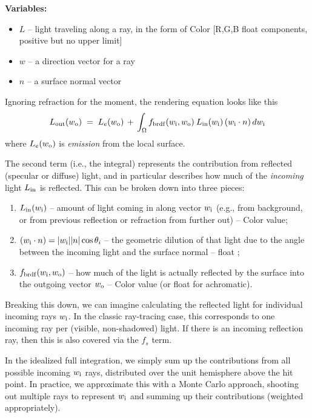 \documentclass[11pt]{article}
\newcommand{\win}{\ensuremath{w_{\rm i}}}
\newcommand{\wout}{\ensuremath{w_{\rm o}}}
\begin{document}
\textbf{Variables:}
\begin{itemize}
\item $L$ -- light traveling along a ray, in the form of Color [R,G,B float
components, positive but no upper limit]
\item $w$ -- a direction vector for a ray
\item $n$ -- a surface normal vector
\end{itemize}

Ignoring refraction for the moment, the rendering equation looks like this
\begin{equation}
L_{\rm out}(\wout) \; = \; L_{e}(\wout) \, + \, \int_{\Omega} f_{\rm brdf}(\win,\wout) \: L_{\rm in}(\win) \, (\win \cdot n) \, d{\win}
\end{equation}
where $L_{e}(\wout)$ is \textit{emission} from the local surface.

The second term (i.e., the integral) represents the contribution from
reflected (specular or diffuse) light, and in particular describes how
much of the \textit{incoming} light $L_{\rm in}$ is reflected. This can
be broken down into three pieces:
\begin{enumerate}
\item $L_{\rm in}(\win)$ -- amount of light coming in along
vector \win{} (e.g., from
background, or from previous reflection or refraction from further out) -- Color value;

\item $(\win \cdot n) = |\win| |n| \cos \theta_{i}$ -- the geometric dilution of that light 
due to the angle between the incoming light and the surface normal -- float ;

\item $f_{\rm brdf}(\win,\wout)$ -- how much of the light is actually reflected by the surface
into the outgoing vector \wout{} -- Color value (or float for achromatic).
\end{enumerate}

Breaking this down, we can imagine calculating the reflected light for individual
incoming rays $\win$. In the classic ray-tracing case, this corresponds to one
incoming ray per (visible, non-shadowed) light. If there is an incoming reflection
ray, then this is also covered via the $f_{s}$ term.

In the idealized full integration, we simply sum up the contributions from all possible
incoming \win{} rays, distributed over the unit hemisphere above the hit point.
In practice, we approximate this with a Monte Carlo approach, shooting out
multiple rays to represent \win{} and summing up their contributions (weighted appropriately).
\end{document}
